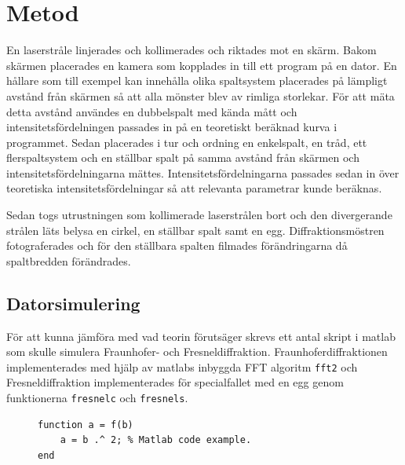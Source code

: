 \documentclass[a4paper]{article}
\begin{document}
\FloatBarrier


\section{Metod}
  
  En laserstråle linjerades och kollimerades och riktades mot en skärm. Bakom skärmen placerades en kamera som kopplades in till ett program på en dator. En hållare som till exempel kan innehålla olika spaltsystem placerades på lämpligt avstånd från skärmen så att alla mönster blev av rimliga storlekar.
  För att mäta detta avstånd användes en dubbelspalt med kända mått och intensitetsfördelningen passades in på en teoretiskt beräknad kurva i programmet. Sedan placerades i tur och ordning en enkelspalt, en tråd, ett flerspaltsystem och en ställbar spalt på samma avstånd från skärmen och intensitetsfördelningarna mättes. Intensitetsfördelningarna passades sedan in över teoretiska intensitetsfördelningar så att relevanta parametrar kunde beräknas.
  
  Sedan togs utrustningen som kollimerade laserstrålen bort och den divergerande strålen läts belysa en cirkel, en ställbar spalt samt en egg. Diffraktionsmöstren fotograferades och för den ställbara spalten filmades förändringarna då spaltbredden förändrades.
  
  \subsection{Datorsimulering}
  
  För att kunna jämföra med vad teorin förutsäger skrevs ett antal skript i matlab som skulle simulera Fraunhofer- och Fresneldiffraktion. Fraunhoferdiffraktionen implementerades med hjälp av matlabs inbyggda FFT algoritm \lstinline{fft2} och Fresneldiffraktion implementerades för specialfallet med en egg genom funktionerna  \lstinline{fresnelc} och \lstinline{fresnels}.
  
  \begin{figure}[ht] %
  \centering
  \begin{lstlisting}
function a = f(b)
	a = b .^ 2; % Matlab code example.
end
  \end{lstlisting}
  \end{figure}
\end{document}
